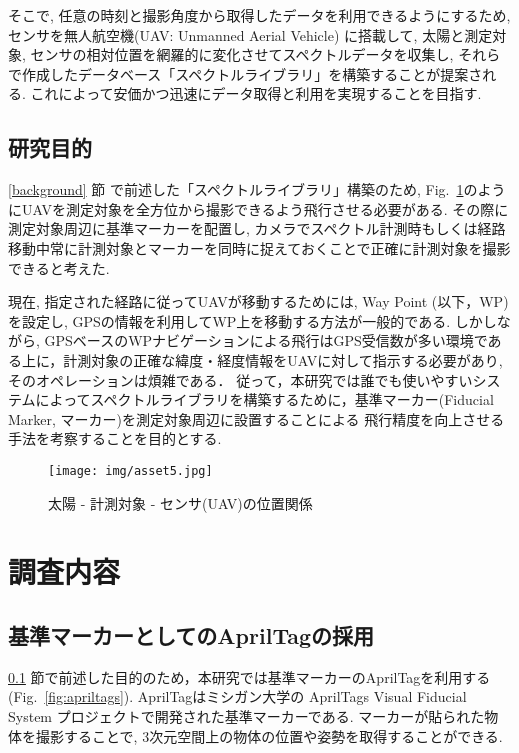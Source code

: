 \documentclass[a4j,fleqn,dvipdfmx,uplatex]{jsarticle}
\newcommand{\figref}[1]{Fig.\ \ref{#1}}
\newcommand{\subsecref}[1]{\ref{#1}\hspace{0.2zw} 節}
\begin{document}
そこで, 任意の時刻と撮影角度から取得したデータを利用できるようにするため, センサを無人航空機(UAV: Unmanned Aerial Vehicle) に搭載して, 
太陽と測定対象, センサの相対位置を網羅的に変化させてスペクトルデータを収集し, それらで作成したデータベース「スペクトルライブラリ」を構築することが提案される. 
これによって安価かつ迅速にデータ取得と利用を実現することを目指す.

\subsection{研究目的}\label{purpose}
\subsecref{background} で前述した「スペクトルライブラリ」構築のため, \figref{fig:spectrum}のようにUAVを測定対象を全方位から撮影できるよう飛行させる必要がある. 
その際に測定対象周辺に基準マーカーを配置し, カメラでスペクトル計測時もしくは経路移動中常に計測対象とマーカーを同時に捉えておくことで正確に計測対象を撮影できると考えた. 

現在, 指定された経路に従ってUAVが移動するためには, Way Point (以下，WP)を設定し, GPSの情報を利用してWP上を移動する方法が一般的である\cite{WP}. 
しかしながら, GPSベースのWPナビゲーションによる飛行はGPS受信数が多い環境である上に，計測対象の正確な緯度・経度情報をUAVに対して指示する必要があり, そのオペレーションは煩雑である．
従って，本研究では誰でも使いやすいシステムによってスペクトルライブラリを構築するために，基準マーカー(Fiducial Marker, マーカー)を測定対象周辺に設置することによる
飛行精度を向上させる手法を考察することを目的とする. 

\begin{figure}[tb]
    \centering
        \texttt{[image: img/asset5.jpg]}
        \caption{太陽 - 計測対象 - センサ(UAV)の位置関係}
        \label{fig:spectrum}
\end{figure}

\section{調査内容}\label{sec2}

\subsection{基準マーカーとしてのAprilTagの採用}\label{subsec:apriltag}
\subsecref{purpose}で前述した目的のため，本研究では基準マーカーのAprilTagを利用する(\figref{fig:apriltags}). 
AprilTagはミシガン大学の AprilTags Visual Fiducial System プロジェクトで開発された基準マーカーである. 
マーカーが貼られた物体を撮影することで, 3次元空間上の物体の位置や姿勢を取得することができる. 
\end{document}
